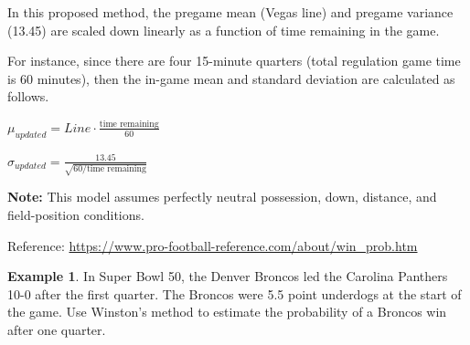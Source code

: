 \documentclass[
  11pt,
]{book}
\theoremstyle{definition}
\theoremstyle{definition}
\newtheorem{example}{Example}[chapter]
\theoremstyle{definition}
\theoremstyle{definition}
\theoremstyle{remark}
\begin{document}
In this proposed method, the pregame mean (Vegas line) and pregame variance (13.45) are scaled down linearly as a function of time remaining in the game.

For instance, since there are four 15-minute quarters (total regulation game time is 60 minutes), then the in-game mean and standard deviation are calculated as follows.

\(\mu_{updated} = Line \cdot \frac{\text{time remaining}}{60}\)

\(\sigma_{updated} = \frac{13.45}{\sqrt{60/\text{time remaining}}}\)

\textbf{Note:} This model assumes perfectly neutral possession, down, distance, and field-position conditions.

Reference: \url{https://www.pro-football-reference.com/about/win_prob.htm}

\begin{example}
In Super Bowl 50, the Denver Broncos led the Carolina Panthers 10-0 after the first quarter. The Broncos were 5.5 point underdogs at the start of the game. Use Winston's method to estimate the probability of a Broncos win after one quarter.\\

\end{example}
\end{document}
